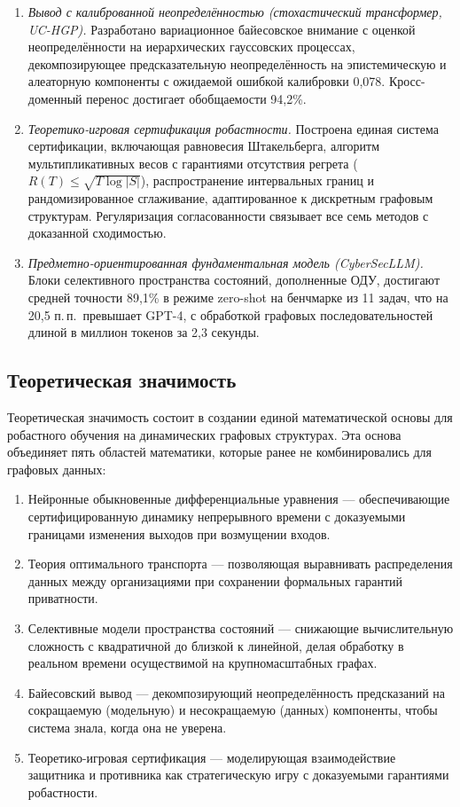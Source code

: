 \documentclass[12pt,a5paper]{article}
\begin{document}
\begin{enumerate}
\item \textit{Вывод с калиброванной неопределённостью (стохастический трансформер, UC-HGP).} Разработано вариационное байесовское внимание с оценкой неопределённости на иерархических гауссовских процессах, декомпозирующее предсказательную неопределённость на эпистемическую и алеаторную компоненты с ожидаемой ошибкой калибровки 0,078. Кросс-доменный перенос достигает обобщаемости 94,2\%.

\item \textit{Теоретико-игровая сертификация робастности.} Построена единая система сертификации, включающая равновесия Штакельберга, алгоритм мультипликативных весов с гарантиями отсутствия регрета ($R(T) \leq \sqrt{T \log |S|}$), распространение интервальных границ и рандомизированное сглаживание, адаптированное к дискретным графовым структурам. Регуляризация согласованности связывает все семь методов с доказанной сходимостью.

\item \textit{Предметно-ориентированная фундаментальная модель (CyberSecLLM).} Блоки селективного пространства состояний, дополненные ОДУ, достигают средней точности 89,1\% в режиме zero-shot на бенчмарке из 11 задач, что на 20,5 п.\,п.\ превышает GPT-4, с обработкой графовых последовательностей длиной в миллион токенов за 2,3 секунды.
\end{enumerate}

\subsection*{Теоретическая значимость}

Теоретическая значимость состоит в создании единой математической основы для робастного обучения на динамических графовых структурах. Эта основа объединяет пять областей математики, которые ранее не комбинировались для графовых данных:

\begin{enumerate}
\item Нейронные обыкновенные дифференциальные уравнения --- обеспечивающие сертифицированную динамику непрерывного времени с доказуемыми границами изменения выходов при возмущении входов.

\item Теория оптимального транспорта --- позволяющая выравнивать распределения данных между организациями при сохранении формальных гарантий приватности.

\item Селективные модели пространства состояний --- снижающие вычислительную сложность с квадратичной до близкой к линейной, делая обработку в реальном времени осуществимой на крупномасштабных графах.

\item Байесовский вывод --- декомпозирующий неопределённость предсказаний на сокращаемую (модельную) и несокращаемую (данных) компоненты, чтобы система знала, когда она не уверена.

\item Теоретико-игровая сертификация --- моделирующая взаимодействие защитника и противника как стратегическую игру с доказуемыми гарантиями робастности.
\end{enumerate}
\end{document}
